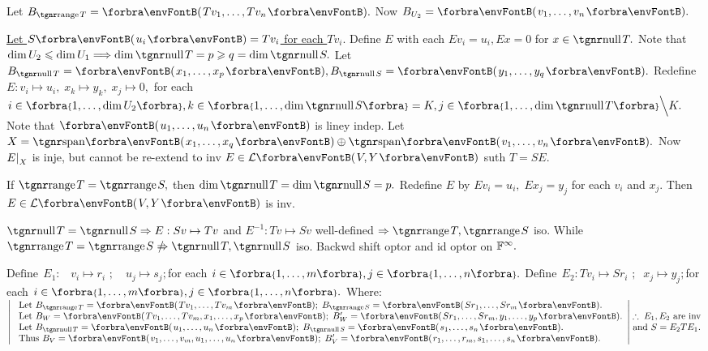  \;Let $B_{\range T}=\Par{Tv_1,\dots,Tv_n}.$ Now $B_{U_2}=\Par{v_1,\dots,v_n}.$\par\quad
\uline{Let $S\Par{u_i}=Tv_i$ for each $Tv_i.$} \;Define $E$ with each $Ev_i=u_i,Ex=0$ for $x\in\null T.$\PfEnd\vspace{4pt}\quad
\AComm {} \;Note that $\dim U_2\leqslant\dim U_1\Longrightarrow\dim\null T=p\geqslant q=\dim\null S.$\parCom\quad
Let $B_{\null T}=\Par{x_1,\dots,x_p},B_{\null S}=\Par{y_1,\dots,y_q}.$ Redefine $E:v_i\mapsto u_i,\;x_k\mapsto y_k,\;x_j\mapsto 0,$\parCom\quad
for each $i\in\Bra{1,\dots,\dim U_2},k\in\Bra{1,\dots,\dim\null S}=K,j\in\Bra{1,\dots,\dim\null T}\Backslash[\Big]K.$\parCom\quad
Note that $\Par{u_1,\dots,u_n}$ is liney indep. Let $X=\Span{x_1,\dots,x_q}\oplus\Span{v_1,\dots,v_n}.$\parCom\quad
Now $E\text{\normalsize|}_X$ is inje, but cannot be re-extend to inv $E\in\Lm{V,Y}$ suth $T=SE.$\par{}\vspace{4pt}\quad
\ACoro {} \;If $\range T=\range S,$ then $\dim\null T=\dim\null S=p.$\parCor\quad
Redefine $E$ by $Ev_i=u_i,\;Ex_j=y_j$ for each $v_i$ and $x_j.$ Then $E\in\Lm{V,Y}$ is inv.\PfEnd
\SepLine

\BulletPointX\ANote $\null T=\null S\Rightarrow E:Sv\mapsto Tv$ and $E^{-1}:Tv\mapsto Sv$ well-defined $\Rightarrow\range T,\range S$ iso.\parNot{\IndentB}
While $\range T=\range S\notRightarrow\null T,\null S$ iso. \;\AExa Backwd shift optor and id optor on ${\mathbb{F}}^{\infty}.$
\SepLine

$\text{Define}\;\,E_1:\,\,\,\,\, v_i\mapsto r_i\,\,;\quad u_j\mapsto s_j;$\quad for each $i\in\Bra{1,\dots,m},j\in\Bra{1,\dots,n}.$\parSol{}
$\text{Define}\;\,E_2:Tv_i\mapsto Sr_i\,\,;\;\;x_j\mapsto y_j;$\quad for each $i\in\Bra{1,\dots,m},j\in\Bra{1,\dots,n}.$
Where:\parSol{\vspace{2pt}}
$\MathLeftrightMid{l}{$
	Let $B_{\range T}=\Par{Tv_1,\dots,Tv_m};\;B_{\range S}=\Par{Sr_1,\dots,Sr_m}.\\ $
	Let $B_W=\Par{Tv_1,\dots,Tv_m,x_1,\dots,x_p};\;B_W'=\Par{Sr_1,\dots,Sr_m,y_1,\dots,y_p}.\\ $
	Let $B_{\null T}=\Par{u_1,\dots,u_n};\;B_{\null S}=\Par{s_1,\dots,s_n}.\\ $
	Thus $B_V=\Par{v_1,\dots,v_m,u_1,\dots,u_n};\;B_V'=\Par{r_1,\dots,r_m,s_1,\dots,s_n}.}\hMath{c}{}{}{\therefore\;E_1,E_2$ are inv$ \\ $and $S=E_2 TE_1.}$\PfEnd
\SepLine

